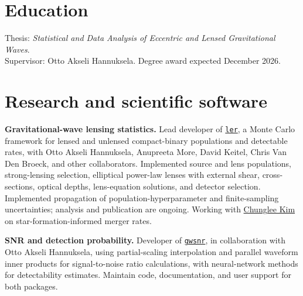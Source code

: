 \documentclass[11pt]{article}
\begin{document}

\section*{Education}
Thesis: \textit{Statistical and Data Analysis of Eccentric and Lensed Gravitational Waves}.\\
Supervisor: Otto Akseli Hannuksela. Degree award expected December 2026.

\section*{Research and scientific software}
\textbf{Gravitational-wave lensing statistics.} Lead developer of
\href{https://ler.hemantaph.com/}{\texttt{ler}}, a Monte Carlo framework for lensed and unlensed compact-binary populations and detectable rates, with Otto Akseli Hannuksela, Anupreeta More, David Keitel, Chris Van Den Broeck, and other collaborators. Implemented source and lens populations, strong-lensing selection, elliptical power-law lenses with external shear, cross-sections, optical depths, lens-equation solutions, and detector selection. Implemented propagation of population-hyperparameter and finite-sampling uncertainties; analysis and publication are ongoing. Working with \href{https://pure.ewha.ac.kr/en/persons/chunglee-kim/}{Chunglee Kim} on star-formation-informed merger rates.

\textbf{SNR and detection probability.} Developer of
\href{https://gwsnr.hemantaph.com/}{\texttt{gwsnr}}, in collaboration with Otto Akseli Hannuksela, using partial-scaling interpolation and parallel waveform inner products for signal-to-noise ratio calculations, with neural-network methods for detectability estimates. Maintain code, documentation, and user support for both packages.
\end{document}
